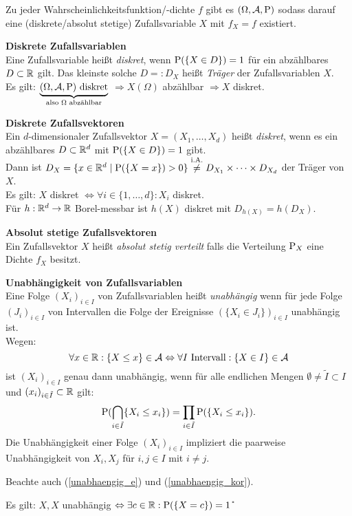 Zu jeder Wahrscheinlichkeitsfunktion/-dichte $f$ gibt es $(\Omega,\A,\P)$ sodass
darauf eine (diskrete/absolut stetige) Zufallsvariable $X$ mit $f_X=f$ existiert.

\textbf{Diskrete Zufallsvariablen}\\
Eine Zufallsvariable heißt \textit{diskret}, wenn $\P(\{X\in D\})=1$
für ein abzählbares $D\subset\R$ gilt.
Das kleinste solche $D=:D_X$ heißt \textit{Träger} der Zufallsvariablen $X$.\\
Es gilt: 
$\underbrace{(\Omega,\A,\P) \text{ diskret}}_{\text{also $\Omega$ abzählbar}}$
$\Rightarrow X(\Omega)$ abzählbar $\Rightarrow X$ diskret.

\textbf{Diskrete Zufallsvektoren}\\
Ein $d$-dimensionaler Zufallsvektor $X=(X_1,\ldots,X_d)$ heißt \textit{diskret},
wenn es ein abzählbares $D\subset\R^d$ mit $\P(\{X\in D\})=1$ gibt.\\
Dann ist $D_X=\{x\in\R^d\mid \P(\{X=x\})>0\}\overset{\text{i.A.}}{\neq} 
D_{X_1}\times\cdots\times D_{X_d}$
der Träger von $X$.\\
Es gilt: $X$ diskret $\Leftrightarrow\forall i\in\{1,\ldots,d\}: X_i$ diskret.\\
Für $h:\R^d\to\R$ Borel-messbar ist $h(X)$ diskret mit $D_{h(X)}=h(D_X)$.

\textbf{Absolut stetige Zufallsvektoren}\\
Ein Zufallsvektor $X$ heißt \textit{absolut stetig verteilt} falls die Verteilung
$\P_X$ eine Dichte $f_X$ besitzt.

\textbf{Unabhängigkeit von Zufallsvariablen}\\
Eine Folge $(X_i)_{i\in I}$ von Zufallsvariablen heißt \textit{unabhängig} wenn für
jede Folge $(J_i)_{i\in I}$ von Intervallen die Folge der Ereignisse
$(\{X_i\in J_i\})_{i\in I}$ unabhängig ist.\\
Wegen:
\[
	\forall x\in\R:\{X\leq x\}\in\A
	\Leftrightarrow\forall I \text{ Intervall}:\{X\in I\}\in\A
\]
ist $(X_i)_{i\in I}$ genau dann unabhängig, wenn für alle endlichen Mengen
$\emptyset\neq\tilde{I}\subset I$ und $(x_i)_{i\in\tilde{I}}\subset\R$ gilt:
\[
	\P(\bigcap_{i\in\tilde{I}}\{X_i\leq x_i\})=
	\prod_{i\in\tilde{I}}\P(\{X_i\leq x_i\}).
\]
Die Unabhängigkeit einer Folge $(X_i)_{i\in I}$ impliziert die paarweise
Unabhängigkeit von $X_i,X_j$ für $i,j\in I$ mit $i\neq j$.

Beachte auch (\ref{unabhaengig_e}) und (\ref{unabhaengig_kor}).

Es gilt: $X,X$ unabhängig $\Leftrightarrow\exists c\in\R:\P(\{X=c\})=1$ \U

